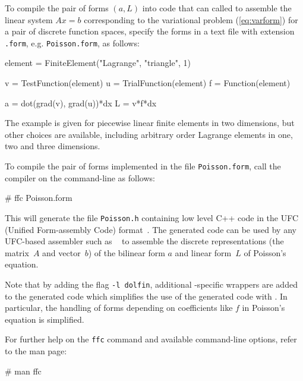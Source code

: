 To compile the pair of forms $(a, L)$ into code that can called to
assemble the linear system $A x = b$ corresponding to the variational
problem (\ref{eq:varform}) for a pair of discrete function spaces,
specify the forms in a text file with extension \texttt{.form},
e.g. \texttt{Poisson.form}, as follows:
\begin{code}
element = FiniteElement("Lagrange", "triangle", 1)

v = TestFunction(element)
u = TrialFunction(element)
f = Function(element)
  
a = dot(grad(v), grad(u))*dx
L = v*f*dx
\end{code}

The example is given for piecewise linear finite elements in two
dimensions, but other choices are available, including arbitrary order
Lagrange elements in one, two and three dimensions.

To compile the pair of forms implemented in the file
\texttt{Poisson.form}, call the compiler on the command-line as
follows:
\begin{code}
# ffc Poisson.form
\end{code}
This will generate the file \texttt{Poisson.h} containing low level
C++ code in the UFC (Unified Form-assembly Code)
format~\cite{www:ufc,ufcmanual}. The generated code can be used by
any UFC-based assembler such as \dolfin{}~\cite{www:dolfin} to
assemble the discrete representations (the matrix~$A$ and vector~$b$)
of the bilinear form $a$ and linear form~$L$ of Poisson's equation.

Note that by adding the flag \texttt{-l dolfin}, additional
\dolfin{}-specific wrappers are added to the generated code which
simplifies the use of the generated code with \dolfin{}. In
particular, the handling of forms depending on coefficients like $f$
in Poisson's equation is simplified.

For further help on the \texttt{ffc} command and available
command-line options, refer to the \ffc{} man page:
\begin{code}
# man ffc
\end{code}
